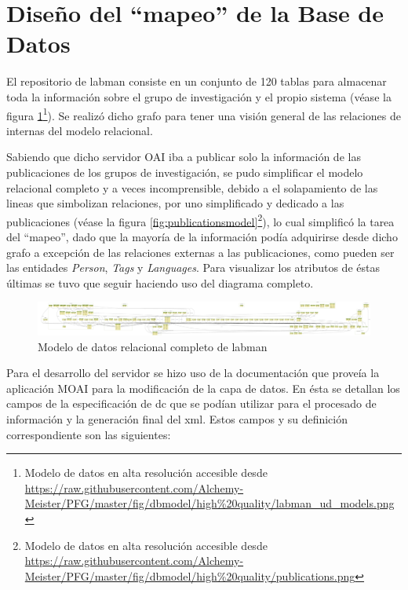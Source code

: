\section{Diseño del ``mapeo'' de la Base de Datos}

El repositorio de \acrshort{labman} consiste en un conjunto de 120 tablas para almacenar toda la información sobre el grupo de investigación y el propio sistema (véase la figura \ref{fig:labmanmodel}\footnote{Modelo de datos en alta resolución accesible desde \url{https://raw.githubusercontent.com/Alchemy-Meister/PFG/master/fig/dbmodel/high\%20quality/labman\_ud\_models.png}}). Se realizó dicho grafo para tener una visión general de las relaciones de internas del modelo relacional.

Sabiendo que dicho servidor OAI iba a publicar solo la información de las publicaciones de los grupos de investigación, se pudo simplificar el modelo relacional completo y a veces incomprensible, debido a el solapamiento de las lineas que simbolizan relaciones, por uno simplificado y dedicado a las publicaciones (véase la figura \ref{fig:publicationsmodel}\footnote{Modelo de datos en alta resolución accesible desde \url{https://raw.githubusercontent.com/Alchemy-Meister/PFG/master/fig/dbmodel/high\%20quality/publications.png}}), lo cual simplificó la tarea del ``mapeo'', dado que la mayoría de la información podía adquirirse desde dicho grafo a excepción de las relaciones externas a las publicaciones, como pueden ser las entidades \textit{Person}, \textit{Tags} y \textit{Languages}. Para visualizar los atributos de éstas últimas se tuvo que seguir haciendo uso del diagrama completo.

\begin{figure}[!htbp]
	\centering
	\includegraphics[angle=90, scale=0.072]{fig/dbmodel/labman_model}
	\caption{Modelo de datos relacional completo de \acrshort{labman}}
	\label{fig:labmanmodel}
\end{figure}

Para el desarrollo del servidor se hizo uso de la documentación que proveía la aplicación MOAI para la modificación de la capa de datos. En ésta se detallan los campos de la especificación de \acrshort{dc} que se podían utilizar para el procesado de información y la generación final del \acrshort{xml}. Estos campos y su definición correspondiente son las siguientes:

